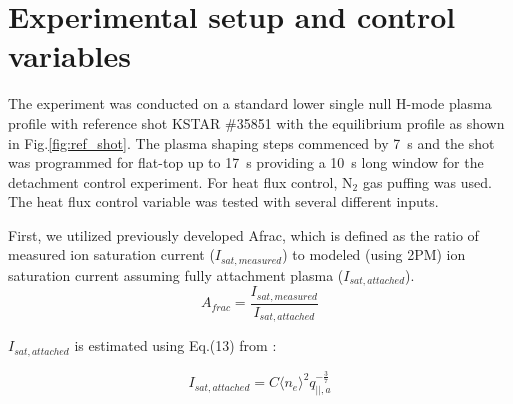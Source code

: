 

\section{Experimental setup and control variables}
\label{sec:control_variables}



The experiment was conducted on a standard lower single null H-mode plasma profile with reference shot KSTAR \#35851 with the equilibrium profile as shown in Fig.\ref{fig:ref_shot}.
The plasma shaping steps commenced by 7~s and the shot was programmed for flat-top up to 17~s providing a 10~s long window for the detachment control experiment.
For heat flux control, N$_2$ gas puffing was used.
The heat flux control variable was tested with several different inputs.

First, we utilized previously developed \ac{Afrac}\cite{Eldon_2022_PPCF}, which is defined as the ratio of measured ion saturation current ($I_{sat, measured}$) to modeled (using 2PM\cite{Leonard_2018_PPCF}) ion saturation current assuming fully attachment plasma ($I_{sat, attached}$).
\begin{equation}
    A_{frac} = \frac{I_{sat, measured}}{I_{sat, attached}}
\end{equation}

$I_{sat, attached}$ is estimated using Eq.(13) from \cite{Eldon_2022_PPCF}:

\begin{equation}
    I_{sat, attached} = C \langle n_{e} \rangle^2 q_{||, a}^{-\frac{3}{7}} 
\end{equation}

